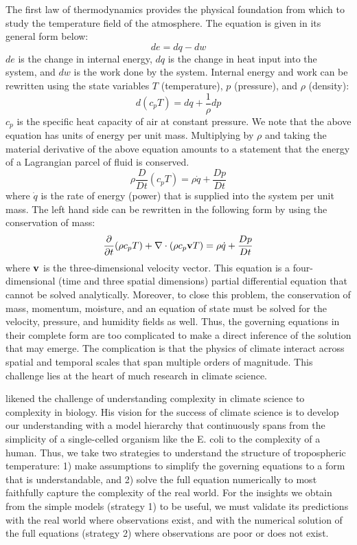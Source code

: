 \documentclass{article}
\begin{document}
The first law of thermodynamics provides the physical foundation from which to study the temperature field of the atmosphere. The equation is given in its general form below:
\begin{equation}
de = dq - dw
\end{equation}
$de$ is the change in internal energy, $dq$ is the change in heat input into the system, and $dw$ is the work done by the system. Internal energy and work can be rewritten using the state variables $T$ (temperature), $p$ (pressure), and $\rho$ (density):
\begin{equation}
d(c_p T) = dq + \frac{1}{\rho} dp
\end{equation}
$c_p$ is the specific heat capacity of air at constant pressure. We note that the above equation has units of energy per unit mass. Multiplying by $\rho$ and taking the material derivative of the above equation amounts to a statement that the energy of a Lagrangian parcel of fluid is conserved.
\begin{equation}
\rho \frac{D}{Dt}(c_p T) = \rho \dot{q} + \frac{Dp}{Dt}
\end{equation}
where $\dot{q}$ is the rate of energy (power) that is supplied into the system per unit mass. The left hand side can be rewritten in the following form by using the conservation of mass:
\begin{equation}
\frac{\partial}{\partial t}(\rho c_p T) + \nabla \cdot (\rho c_p \bold{v} T) = \rho \dot{q} + \frac{Dp}{Dt}
\end{equation}
where $\bold{v}$ is the three-dimensional velocity vector. This equation is a four-dimensional (time and three spatial dimensions) partial differential equation that cannot be solved analytically. Moreover, to close this problem, the conservation of mass, momentum, moisture, and an equation of state must be solved for the velocity, pressure, and humidity fields as well. Thus, the governing equations in their complete form are too complicated to make a direct inference of the solution that may emerge. The complication is that the physics of climate interact across spatial and temporal scales that span multiple orders of magnitude. This challenge lies at the heart of much research in climate science.

\citet{held-2005} likened the challenge of understanding complexity in climate science to complexity in biology. His vision for the success of climate science is to develop our understanding with a model hierarchy that continuously spans from the simplicity of a single-celled organism like the E. coli to the complexity of a human. Thus, we take two strategies to understand the structure of tropospheric temperature: 1) make assumptions to simplify the governing equations to a form that is understandable, and 2) solve the full equation numerically to most faithfully capture the complexity of the real world. For the insights we obtain from the simple models (strategy 1) to be useful, we must validate its predictions with the real world where observations exist, and with the numerical solution of the full equations (strategy 2) where observations are poor or does not exist. 
\end{document}
